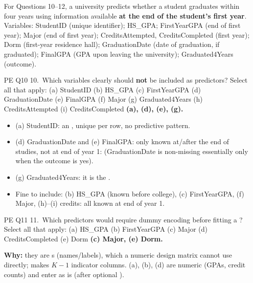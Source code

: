 \noindent For Questions 10--12, a university predicts whether a student graduates within four years using information available \textbf{at the end of the student's first year}. Variables: StudentID (unique identifier); HS\_GPA; FirstYearGPA (end of first year); Major (end of first year); CreditsAttempted, CreditsCompleted (first year); Dorm (first-year residence hall); GraduationDate (date of graduation, if graduated); FinalGPA (GPA upon leaving the university); Graduated4Years (outcome).\par

\begin{qbox}{PE Q10}
10.~Which variables clearly should \textbf{not} be included as predictors? Select all that apply: (a) StudentID (b) HS\_GPA (c) FirstYearGPA (d) GraduationDate (e) FinalGPA (f) Major (g) Graduated4Years (h) CreditsAttempted (i) CreditsCompleted
\ans \textbf{(a), (d), (e), (g).}
\begin{itemize}[leftmargin=1em,itemsep=0pt]
\item (a) StudentID: an , unique per row, no predictive pattern.
\item (d) GraduationDate and (e) FinalGPA: only known at/after the end of studies, not at end of year 1:  (GraduationDate is non-missing essentially only when the outcome is yes).
\item (g) Graduated4Years: it is the .
\item Fine to include: (b) HS\_GPA (known before college), (c) FirstYearGPA, (f) Major, (h)--(i) credits: all known at end of year 1.
\end{itemize}
\end{qbox}

\begin{qbox}{PE Q11}
11.~Which predictors would require dummy encoding before fitting a ? Select all that apply: (a) HS\_GPA (b) FirstYearGPA (c) Major (d) CreditsCompleted (e) Dorm
\ans \textbf{(c) Major, (e) Dorm.}\par
\textbf{Why:} they are s (names/labels), which a numeric design matrix cannot use directly;  makes $K-1$ indicator columns. (a), (b), (d) are numeric (GPAs, credit counts) and enter as is (after optional ). 
\end{qbox}

